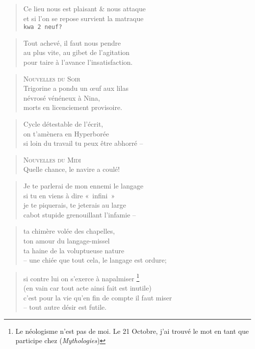   \begin{verse}
    Ce lieu nous est plaisant \& nous attaque\\
    et si l’on se repose survient la matraque\\
    \texttt{kwa 2 neuf?}
  \end{verse}
  \begin{verse}
    Tout achevé, il faut nous pendre\\
    au plus vite, au gibet de l’agitation\\
    pour taire à l’avance l’insatisfaction.
  \end{verse}
  \begin{verse}
    \textsc{Nouvelles du Soir}\\
    Trigorine a pondu un œuf aux lilas\\
    névrosé vénéneux à Nina,\\
     morts en licenciement provisoire.
  \end{verse}
  \begin{verse}
    Cycle détestable de l’écrit,\\
    on t’amènera en Hyperborée\\
    si loin du travail tu peux être abhorré --
  \end{verse}
  \begin{verse}
    \textsc{Nouvelles du Midi}\\
    Quelle chance, le navire a coulé!
  \end{verse}

  \begin{verse}
    Je te parlerai de mon ennemi le langage\\
    si tu en viens à dire «~infini~»\\
    je te piquerais, te jeterais au large\\
    cabot stupide grenouillant l’infamie --
  \end{verse}
  \begin{verse}
    ta chimère volée des chapelles,\\
    ton amour du langage-missel\\
    ta haine de la voluptueuse nature\\
    -- une chiée que tout cela, le langage est ordure;
  \end{verse}
  \begin{verse}
    si contre lui on s’exerce à napalmiser
    \footnote{Le néologisme n’est pas de moi. Le 21 Octobre, j’ai trouvé le mot en tant que participe chez  (\emph{Mythologies})}\\
    (en vain car tout acte ainsi fait est inutile)\\
    c’est pour la vie qu’en fin de compte il faut miser\\
    -- tout autre désir est futile.
  \end{verse}

